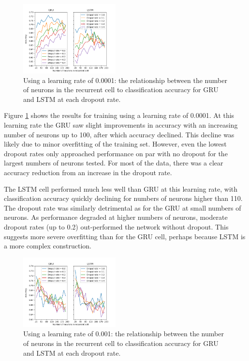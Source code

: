     \begin{figure}[ht]
      \includegraphics[width=0.45\textwidth]{Figures/n_neurons_plot-0-0001.png}
      \caption{Using a learning rate of 0.0001: the relationship between the number of neurons in the recurrent
        cell to classification accuracy for GRU and LSTM at each dropout rate.}
      \label{fig:learn_rate_0.0001}
    \end{figure}

    Figure \ref{fig:learn_rate_0.0001} shows the results for training using a
    learning rate of 0.0001. At this learning rate the GRU saw slight improvements in
    accuracy with an increasing number of neurons up to 100, after which
    accuracy declined. This decline was likely due to minor overfitting of the
    training set. However, even the lowest dropout rates only approached
    performance on par with no dropout for the largest numbers of neurons
    tested. For most of the data, there was a clear accuracy reduction from an
    increase in the dropout rate.

    The LSTM cell performed much less well than GRU at this learning rate, with
    classification accuracy quickly declining for numbers of neurons higher than
    110. The dropout rate was similarly detrimental as for the GRU at
    small numbers of neurons. As performance degraded at higher numbers of
    neurons, moderate dropout rates (up to 0.2) out-performed the network without
    dropout. This suggests more severe overfitting than for the GRU cell,
    perhaps because LSTM is a more complex construction. 

    \begin{figure}[ht]
      \includegraphics[width=0.45\textwidth]{Figures/n_neurons_plot-0-001.png}
      \caption{Using a learning rate of 0.001: the relationship between the number of neurons in the recurrent
        cell to classification accuracy for GRU and LSTM at each dropout rate.}
      \label{fig:learn_rate_0.001}
    \end{figure}

